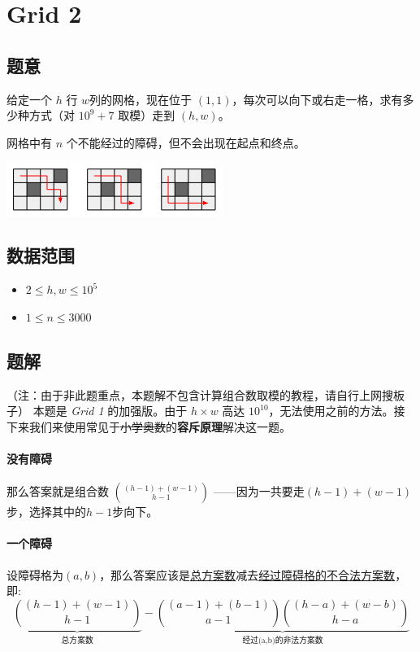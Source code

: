 \section{Grid 2}
\subsection*{题意}
给定一个 $h$ 行 $w$列的网格，现在位于 $(1,1)$，每次可以向下或右走一格，求有多少种方式（对 $10^9 + 7$ 取模）走到 $(h,w)$。

网格中有 $n$ 个不能经过的障碍，但不会出现在起点和终点。
\begin{center}
\includegraphics[width=7cm]{./Pics/grid.png}
\end{center}
\subsection*{数据范围}
\begin{itemize}
\item $2 \leq h, w \leq 10^5$
\item $1 \leq n \leq 3000$
\end{itemize}


\subsection*{题解}

（注：由于非此题重点，本题解不包含计算组合数取模的教程，请自行上网搜板子）
本题是 \textit{Grid 1} 的加强版。由于 $h\times w$ 高达 $10^{10}$，无法使用之前的方法。接下来我们来使用常见于\sout{小学奥数}的\textbf{容斥原理}解决这一题。

\paragraph{没有障碍}那么答案就是组合数 $\binom{(h-1)+(w-1)}{h-1}$ ——因为一共要走$(h-1)+(w-1)$步，选择其中的$h-1$步向下。

\paragraph{一个障碍}设障碍格为$(a,b)$，那么答案应该是\uline{总方案数}减去\uline{经过障碍格的不合法方案数}，即:
$$
\underbrace{\binom{(h-1)+(w-1)}{h-1}}_{\text{总方案数}} - \underbrace{\binom{(a-1)+(b-1)}{a-1}\binom{(h-a)+(w-b)}{h-a}}_{\text{经过(a,b)的非法方案数}}
$$
